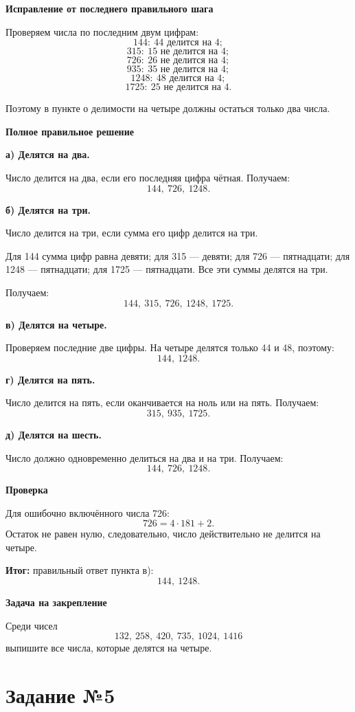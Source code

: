 \documentclass[12pt,a4paper]{article}
\newcommand{\result}{\textcolor{teal!60!black}{Итог:}}
\begin{document}
\textbf{Исправление от последнего правильного шага}

Проверяем числа по последним двум цифрам:
\[
144:\ 44 \text{ делится на }4;
\]
\[
315:\ 15 \text{ не делится на }4;
\]
\[
726:\ 26 \text{ не делится на }4;
\]
\[
935:\ 35 \text{ не делится на }4;
\]
\[
1248:\ 48 \text{ делится на }4;
\]
\[
1725:\ 25 \text{ не делится на }4.
\]

Поэтому в пункте о делимости на четыре должны остаться только два числа.

\textbf{Полное правильное решение}

\textbf{а) Делятся на два.}

Число делится на два, если его последняя цифра чётная. Получаем:
\[
144,\ 726,\ 1248.
\]

\textbf{б) Делятся на три.}

Число делится на три, если сумма его цифр делится на три.

Для 144 сумма цифр равна девяти; для 315 --- девяти; для 726 --- пятнадцати; для 1248 --- пятнадцати; для 1725 --- пятнадцати. Все эти суммы делятся на три.

Получаем:
\[
144,\ 315,\ 726,\ 1248,\ 1725.
\]

\textbf{в) Делятся на четыре.}

Проверяем последние две цифры. На четыре делятся только 44 и 48, поэтому:
\[
144,\ 1248.
\]

\textbf{г) Делятся на пять.}

Число делится на пять, если оканчивается на ноль или на пять. Получаем:
\[
315,\ 935,\ 1725.
\]

\textbf{д) Делятся на шесть.}

Число должно одновременно делиться на два и на три. Получаем:
\[
144,\ 726,\ 1248.
\]

\textbf{Проверка}

Для ошибочно включённого числа 726:
\[
726=4\cdot181+2.
\]
Остаток не равен нулю, следовательно, число действительно не делится на четыре.

\textbf{\result} правильный ответ пункта в):
\[
\boxed{144,\ 1248.}
\]

\textbf{Задача на закрепление}

Среди чисел
\[
132,\ 258,\ 420,\ 735,\ 1024,\ 1416
\]
выпишите все числа, которые делятся на четыре.

\newpage
{}\label{task:5}
\section*{Задание №5}
\end{document}
